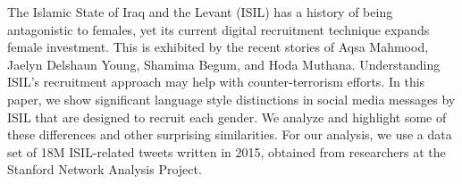 The Islamic State of Iraq and the Levant (ISIL) has a history of being antagonistic to females, yet its current digital recruitment technique expands female investment. This is exhibited by the recent stories of Aqsa Mahmood, Jaelyn Delshaun Young, Shamima Begum, and Hoda Muthana. Understanding ISIL's recruitment approach may help with counter-terrorism efforts. In this paper, we show significant language style distinctions in social media messages by ISIL that are designed to recruit each gender. We analyze and highlight some of these differences and other surprising similarities. For our analysis, we use a data set of 18M ISIL-related tweets written in 2015, obtained from researchers at the Stanford Network Analysis Project.
